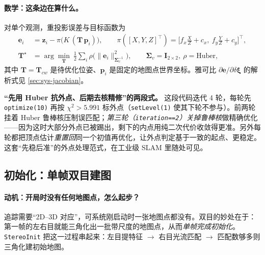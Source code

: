 \paragraph{数学：这条边在算什么。}
对单个观测，重投影误差与目标函数为
\begin{align}
  \mathbf{e}_i &= \mathbf{z}_i-\pi\!\big(K\,(\mathbf{T}\,\mathbf{p}_i)\big),\qquad
  \pi([X,Y,Z]^\top)=\Big[f_x\tfrac{X}{Z}+c_x,\ f_y\tfrac{Y}{Z}+c_y\Big]^\top,
  \label{eq:sys-reproj}\\
  \mathbf{T}^\star &= \arg\min_{\mathbf{T}}\ \tfrac12\sum_i \rho\!\Big(\big\|\mathbf{e}_i\big\|^2_{\boldsymbol\Sigma_v^{-1}}\Big),
  \qquad \boldsymbol\Sigma_v=\mathbf{I}_{2\times2},\ \rho=\text{Huber},
  \label{eq:sys-poseonly}
\end{align}
其中 $\mathbf{T}=\mathbf{T}_{cw}$ 是待优化位姿、$\mathbf{p}_i$ 是固定的地图点世界坐标。雅可比 $\partial\mathbf{e}/\partial\delta\boldsymbol\xi$ 的解析式见 \cref{sec:sys-jacobian}。

\begin{insight}
\textbf{“先用 Huber 抗外点、后期去核精修”的两段式。}
这段代码迭代 4 轮，每轮先 \texttt{optimize(10)} 再按 $\chi^2>5.991$ 标外点（\verb|setLevel(1)| 使其下轮不参与）。前两轮挂着 Huber 鲁棒核压制误匹配；\emph{第三轮（\texttt{iteration==2}）关掉鲁棒核}做精确优化——因为这时大部分外点已被踢出，剩下的内点用纯二次代价收敛得更准。另外每轮都把顶点估计\emph{重置回}同一个初值再优化，让外点判定基于一致的起点、更稳定。这套“先稳后准”的外点处理范式，在工业级 SLAM 里随处可见。
\end{insight}


\subsection{初始化：单帧双目建图}
\label{sec:sys-init}

\paragraph{动机：开局时没有任何地图点，怎么起步？}
追踪需要“2D--3D 对应”，可系统刚启动时一张地图点都没有。双目的妙处在于：第一帧的左右目就能三角化出一批带尺度的地图点，从而\emph{单帧完成初始化}。\texttt{StereoInit} 把这一过程串起来：左目提特征 $\to$ 右目光流匹配 $\to$ 匹配数够多则三角化建初始地图。

